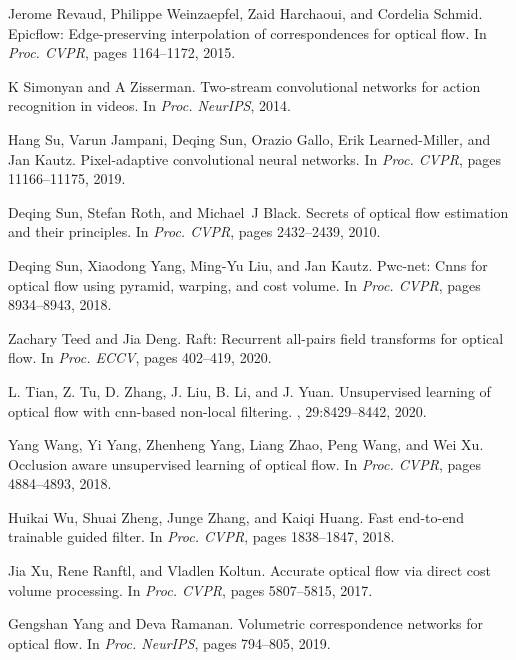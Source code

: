 \documentclass[final]{cvpr}
\begin{document}
\begin{thebibliography}{10}
	Jerome Revaud, Philippe Weinzaepfel, Zaid Harchaoui, and Cordelia Schmid.
	\newblock Epicflow: Edge-preserving interpolation of correspondences for
	optical flow.
	\newblock In {\em {Proc. CVPR}}, pages 1164--1172, 2015.
	
	K Simonyan and A Zisserman.
	\newblock Two-stream convolutional networks for action recognition in videos.
	\newblock In {\em {Proc. NeurIPS}}, 2014.
	
	Hang Su, Varun Jampani, Deqing Sun, Orazio Gallo, Erik Learned-Miller, and Jan
	Kautz.
	\newblock Pixel-adaptive convolutional neural networks.
	\newblock In {\em {Proc. CVPR}}, pages 11166--11175, 2019.
	
	Deqing Sun, Stefan Roth, and Michael~J Black.
	\newblock Secrets of optical flow estimation and their principles.
	\newblock In {\em {Proc. CVPR}}, pages 2432--2439, 2010.
	
	Deqing Sun, Xiaodong Yang, Ming-Yu Liu, and Jan Kautz.
	\newblock Pwc-net: Cnns for optical flow using pyramid, warping, and cost
	volume.
	\newblock In {\em {Proc. CVPR}}, pages 8934--8943, 2018.
	
	Zachary Teed and Jia Deng.
	\newblock Raft: Recurrent all-pairs field transforms for optical flow.
	\newblock In {\em {Proc. ECCV}}, pages 402--419, 2020.
	
	L. {Tian}, Z. {Tu}, D. {Zhang}, J. {Liu}, B. {Li}, and J. {Yuan}.
	\newblock Unsupervised learning of optical flow with cnn-based non-local
	filtering.
	, 29:8429--8442, 2020.
	
	Yang Wang, Yi Yang, Zhenheng Yang, Liang Zhao, Peng Wang, and Wei Xu.
	\newblock Occlusion aware unsupervised learning of optical flow.
	\newblock In {\em {Proc. CVPR}}, pages 4884--4893, 2018.
	
	Huikai Wu, Shuai Zheng, Junge Zhang, and Kaiqi Huang.
	\newblock Fast end-to-end trainable guided filter.
	\newblock In {\em {Proc. CVPR}}, pages 1838--1847, 2018.
	
	Jia Xu, Rene Ranftl, and Vladlen Koltun.
	\newblock Accurate optical flow via direct cost volume processing.
	\newblock In {\em {Proc. CVPR}}, pages 5807--5815, 2017.
	
	Gengshan Yang and Deva Ramanan.
	\newblock Volumetric correspondence networks for optical flow.
	\newblock In {\em {Proc. NeurIPS}}, pages 794--805, 2019.
	

\end{thebibliography}
\end{document}
